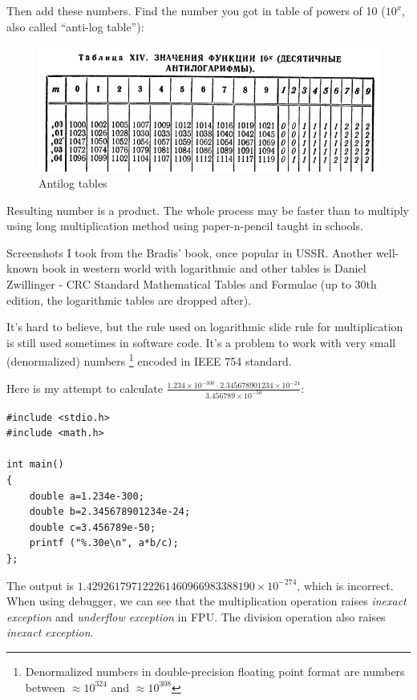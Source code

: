 Then add these numbers. Find the number you got in table of powers of 10 ($10^{x}$, also called ``anti-log table''):

\begin{figure}[H]
\centering
\includegraphics[scale=0.66]{log/bradis2.jpg}
\caption{Antilog tables}
\end{figure}


Resulting number is a product.
The whole process may be faster than to multiply using long multiplication method using paper-n-pencil taught in schools.

Screenshots I took from the Bradis' book, once popular in USSR.
Another well-known book in western world with logarithmic and other tables is 
Daniel Zwillinger - CRC Standard Mathematical Tables and Formulae 
(up to 30th edition, the logarithmic tables are dropped after).


It's hard to believe, but the rule used on logarithmic slide rule for multiplication is still used sometimes in software code.
It's a problem to work with very small (denormalized) numbers
\footnote{Denormalized numbers in double-precision floating point format are numbers between $\approx 10^{324}$ and $\approx 10^{308}$} encoded in IEEE 754 standard. 

Here is my attempt to calculate $\frac{1.234 \times 10^{-300} \cdot 2.345678901234 \times 10^{-24}}{3.456789 \times 10^{-50}}$:

\begin{lstlisting}[caption=C code]
#include <stdio.h>
#include <math.h>

int main()
{
	double a=1.234e-300;
	double b=2.345678901234e-24;
	double c=3.456789e-50;
	printf ("%.30e\n", a*b/c);
};
\end{lstlisting}

The output is $1.429261797122261460966983388190 \times 10^{-274}$, which is incorrect.
When using debugger, we can see that the multiplication operation raises \textit{inexact exception} and \textit{underflow exception} in FPU.
The division operation also raises \textit{inexact exception}.

